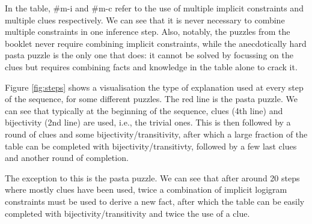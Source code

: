 In the table, \#m-i and \#m-c refer to the use of multiple implicit constraints and multiple clues respectively. We can see that it is never necessary to combine multiple constraints in one inference step. Also, notably, the puzzles from the booklet never require combining implicit constraints, while the anecdotically hard pasta puzzle is the only one that does: it cannot be solved by focussing on the clues but requires combining facts and knowledge in the table alone to crack it.


 Figure \ref{fig:steps} shows a visualisation the type of explanation used at every step of the sequence, for some different puzzles. The red line is the pasta puzzle. We can see that typically at the beginning of the sequence, clues (4th line) and bijectivity (2nd line) are used, i.e., the trivial ones. This is then followed by a round of clues and some bijectivity/transitivity, after which a large fraction of the table can be completed with bijectivity/transitivty, followed by a few last clues and another round of completion.\setlength{\parskip}{0pt}



The exception to this is the pasta puzzle. We can see that after around 20 steps where mostly clues have been used, twice a combination of implicit logigram constraints must be used to derive a new fact, after which the table can be easily completed with bijectivity/transitivity and twice the use of a clue.

